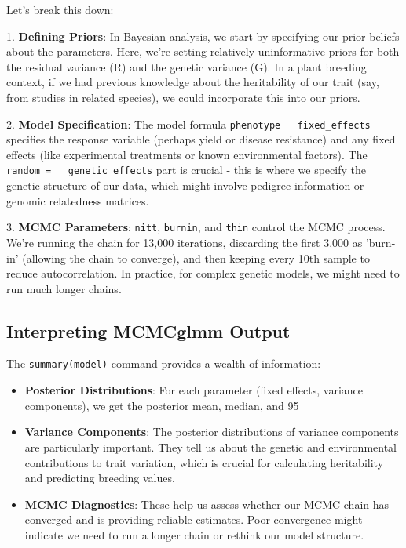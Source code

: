 \documentclass[12pt,a4paper]{article}
\begin{document}
Let's break this down:

1. \textbf{Defining Priors}: In Bayesian analysis, we start by specifying our prior beliefs about the parameters. Here, we're setting relatively uninformative priors for both the residual variance (R) and the genetic variance (G). In a plant breeding context, if we had previous knowledge about the heritability of our trait (say, from studies in related species), we could incorporate this into our priors.

2. \textbf{Model Specification}: The model formula \texttt{phenotype ~ fixed\_effects} specifies the response variable (perhaps yield or disease resistance) and any fixed effects (like experimental treatments or known environmental factors). The \texttt{random = ~ genetic\_effects} part is crucial - this is where we specify the genetic structure of our data, which might involve pedigree information or genomic relatedness matrices.

3. \textbf{MCMC Parameters}: \texttt{nitt}, \texttt{burnin}, and \texttt{thin} control the MCMC process. We're running the chain for 13,000 iterations, discarding the first 3,000 as 'burn-in' (allowing the chain to converge), and then keeping every 10th sample to reduce autocorrelation. In practice, for complex genetic models, we might need to run much longer chains.

\subsection{Interpreting MCMCglmm Output}

The \texttt{summary(model)} command provides a wealth of information:

\begin{itemize}
    \item \textbf{Posterior Distributions}: For each parameter (fixed effects, variance components), we get the posterior mean, median, and 95%
    
    \item \textbf{Variance Components}: The posterior distributions of variance components are particularly important. They tell us about the genetic and environmental contributions to trait variation, which is crucial for calculating heritability and predicting breeding values.
    
    \item \textbf{MCMC Diagnostics}: These help us assess whether our MCMC chain has converged and is providing reliable estimates. Poor convergence might indicate we need to run a longer chain or rethink our model structure.
\end{itemize}
\end{document}
